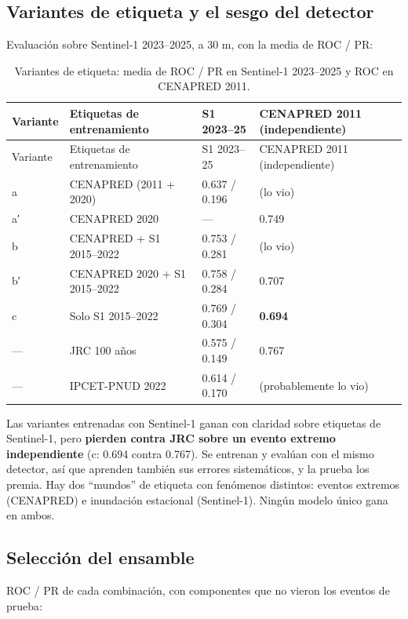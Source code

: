 \subsection{Variantes de etiqueta y el sesgo del detector}

Evaluación sobre Sentinel-1 2023--2025, a 30 m, con la media de ROC / PR:

\begin{longtable}[]{@{}llll@{}}
\caption{Variantes de etiqueta: media de ROC / PR en Sentinel-1 2023--2025 y ROC en CENAPRED 2011.}\tabularnewline
\toprule\noalign{}
Variante & Etiquetas de entrenamiento & S1 2023--25 & CENAPRED 2011 (independiente) \\
\midrule\noalign{}
\endfirsthead
\toprule\noalign{}
Variante & Etiquetas de entrenamiento & S1 2023--25 & CENAPRED 2011 (independiente) \\
\midrule\noalign{}
\endhead
\bottomrule\noalign{}
\endlastfoot
a & CENAPRED (2011 + 2020) & 0.637 / 0.196 & (lo vio) \\
a′ & CENAPRED 2020 & --- & 0.749 \\
b & CENAPRED + S1 2015--2022 & 0.753 / 0.281 & (lo vio) \\
b′ & CENAPRED 2020 + S1 2015--2022 & 0.758 / 0.284 & 0.707 \\
c & Solo S1 2015--2022 & 0.769 / 0.304 & \textbf{0.694} \\
--- & JRC 100 años & 0.575 / 0.149 & 0.767 \\
--- & IPCET-PNUD 2022 & 0.614 / 0.170 & (probablemente lo vio) \\
\end{longtable}

Las variantes entrenadas con Sentinel-1 ganan con claridad sobre etiquetas de Sentinel-1, pero \textbf{pierden contra JRC sobre un evento extremo independiente} (c: 0.694 contra 0.767). Se entrenan y evalúan con el mismo detector, así que aprenden también sus errores sistemáticos, y la prueba los premia. Hay dos ``mundos'' de etiqueta con fenómenos distintos: eventos extremos (CENAPRED) e inundación estacional (Sentinel-1). Ningún modelo único gana en ambos.

\subsection{Selección del ensamble}

ROC / PR de cada combinación, con componentes que no vieron los eventos de prueba:

